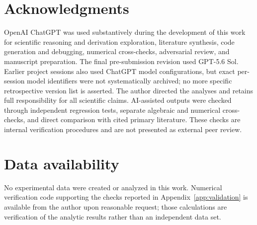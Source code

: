 \documentclass[aps,prd,reprint,nofootinbib,superscriptaddress,longbibliography]{revtex4-2}
\begin{document}
\maketitle








\section*{Acknowledgments}
OpenAI ChatGPT was used substantively during the development of this work for scientific reasoning and derivation exploration, literature synthesis, code generation and debugging, numerical cross-checks, adversarial review, and manuscript preparation. The final pre-submission revision used GPT-5.6 Sol. Earlier project sessions also used ChatGPT model configurations, but exact per-session model identifiers were not systematically archived; no more specific retrospective version list is asserted. The author directed the analyses and retains full responsibility for all scientific claims. AI-assisted outputs were checked through independent regression tests, separate algebraic and numerical cross-checks, and direct comparison with cited primary literature. These checks are internal verification procedures and are not presented as external peer review.

\section*{Data availability}
No experimental data were created or analyzed in this work. Numerical verification code supporting the checks reported in Appendix~\ref{app:validation} is available from the author upon reasonable request; those calculations are verification of the analytic results rather than an independent data set.



\end{document}
